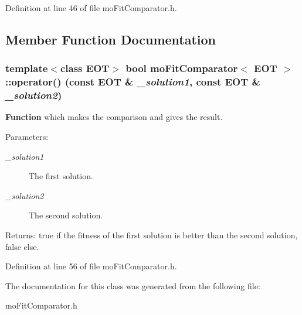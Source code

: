 Definition at line 46 of file moFitComparator.h.

\subsection{Member Function Documentation}
\subsubsection{\setlength{\rightskip}{0pt plus 5cm}template$<$class EOT$>$ bool {\bf moFitComparator}$<$ EOT $>$::operator() (const EOT \& {\em \_\-solution1}, const EOT \& {\em \_\-solution2})\hspace{0.3cm}{\tt  [inline]}}\label{classmo_fit_comparator_c920d5a49deb16710daf1e5fcde6b16c}


{\bf Function} which makes the comparison and gives the result. 

\begin{Desc}
\item[Parameters:]
\begin{description}
\item[{\em \_\-solution1}]The first solution. \item[{\em \_\-solution2}]The second solution. \end{description}
\end{Desc}
\begin{Desc}
\item[Returns:]true if the fitness of the first solution is better than the second solution, false else. \end{Desc}


Definition at line 56 of file moFitComparator.h.

The documentation for this class was generated from the following file:\begin{CompactItemize}
\item 
moFitComparator.h\end{CompactItemize}
